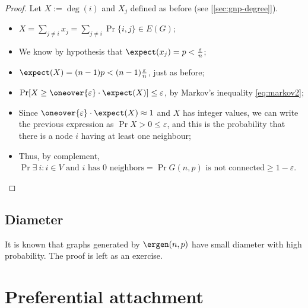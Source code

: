 \begin{proof}
    Let $X := \deg(i)$ and $X_j$ defined as before (see [\ref{sec:gnp-degree}]).
    \begin{itemize}
        \item $X = \sum_{j \neq i} x_j = \sum_{j \neq i} \Pr{\{i, j\} \in E(G)}$;
        \item We know by hypothesis that $\expect(x_j) = p < \frac{\varepsilon}{n}$;
        \item $\expect(X) = (n - 1)p < (n - 1) \frac{\varepsilon}{n}$, just as before;
        \item $\Pr[X \geq \oneover{\varepsilon} \cdot \expect(X)] \leq \varepsilon$, by Markov's inequality \ref{eq:markov2};
        \item Since $\oneover{\varepsilon} \cdot \expect(X) \approx 1$ and $X$ has integer values, we can write the previous expression as $\Pr{X > 0} \leq \varepsilon$, and this is the probability that there is a node $i$ having at least one neighbour;
        \item Thus, by complement, $\Pr{\exists\ i : i \in V \text{ and } i \text{ has 0 neighbors}} = \Pr{G(n,p) \text{ is not connected}} \geq 1 - \varepsilon$.
    \end{itemize}
\end{proof}
    

\subsection{Diameter}

It is known that graphs generated by $\ergen(n,p)$ have small diameter with high probability. The proof is left as an exercise.


\section[Preferential attachment]{Preferential attachment\raisebox{.3\baselineskip}{\normalsize\footnotemark}}
\label{sec:pref-att}

